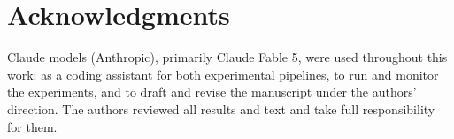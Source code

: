 \documentclass[journal]{IEEEtran}
\begin{document}
\section*{Acknowledgments}

Claude models (Anthropic), primarily Claude Fable 5, were used throughout this work: as a coding assistant
for both experimental pipelines, to run and monitor the experiments, and
to draft and revise the manuscript under the authors' direction. The
authors reviewed all results and text and take full responsibility for
them.



\end{document}
